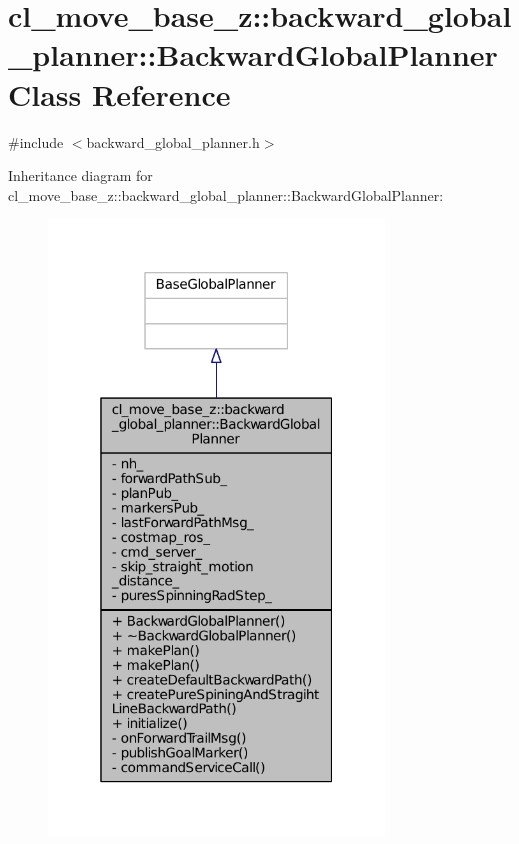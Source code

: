 \hypertarget{classcl__move__base__z_1_1backward__global__planner_1_1BackwardGlobalPlanner}{}\section{cl\+\_\+move\+\_\+base\+\_\+z\+:\+:backward\+\_\+global\+\_\+planner\+:\+:Backward\+Global\+Planner Class Reference}
\label{classcl__move__base__z_1_1backward__global__planner_1_1BackwardGlobalPlanner}


{\ttfamily \#include $<$backward\+\_\+global\+\_\+planner.\+h$>$}



Inheritance diagram for cl\+\_\+move\+\_\+base\+\_\+z\+:\+:backward\+\_\+global\+\_\+planner\+:\+:Backward\+Global\+Planner\+:
\nopagebreak
\begin{figure}[H]
\begin{center}
\leavevmode
\includegraphics[width=253pt]{classcl__move__base__z_1_1backward__global__planner_1_1BackwardGlobalPlanner__inherit__graph}
\end{center}
\end{figure}


